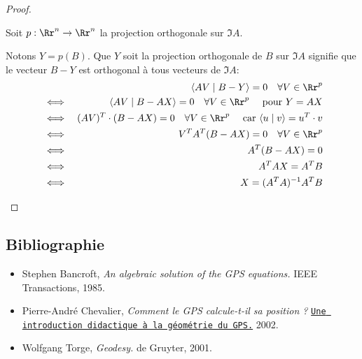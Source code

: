 \documentclass[class=report,crop=false]{standalone}
\begin{document}
\begin{proof}
\begin{enumerate}
  Soit $p : \Rr^n \to \Rr^n$ la projection orthogonale sur $\Im A$.
  
  Notons $Y=p(B)$. Que $Y$ soit la projection orthogonale de $B$ sur $\Im A$ signifie
  que le vecteur $B-Y$ est orthogonal à tous vecteurs de $\Im A$:
  \begin{eqnarray*}
    && \langle AV \mid B-Y \rangle = 0 \quad \forall V \in \Rr^p \\
    & \iff & \langle AV \mid B-AX \rangle = 0 \quad \forall V \in \Rr^p \quad \text{ pour } Y=AX\\
    & \iff & (AV)^T \cdot (B-AX)= 0 \quad \forall V \in \Rr^p \quad \text{ car } \langle u \mid v\rangle = u^T\cdot v\\
    & \iff & V^T  A^T (B-AX)= 0 \quad \forall V \in \Rr^p \\    
    & \iff & A^T (B-AX)= 0 \\
    & \iff & A^TAX= A^T B \\
    & \iff & X = (A^TA)^{-1} A^TB \\    
  \end{eqnarray*}    
\end{enumerate}

\end{proof}



\subsection*{Bibliographie}

\begin{itemize}
  \item Stephen Bancroft, 
\emph{An algebraic solution of the GPS equations.}
IEEE Transactions, 1985.
  
  \item Pierre-André Chevalier, 
\emph{Comment le GPS calcule-t-il sa position ?}
\texttt{\href{https://staff.hti.bfh.ch/cip1/gps/}{Une introduction didactique à la géométrie du GPS.}}
2002.
  
  \item Wolfgang Torge, 
\emph{Geodesy.}
de Gruyter, 2001.
\end{itemize}





\finchapitre
\end{document}
